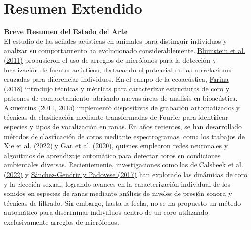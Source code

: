 \documentclass[a4paper,10pt,twocolumn]{article}
\begin{document}
\section{Resumen Extendido}\label{sec:intro}
  
\textbf{Breve Resumen del Estado del Arte}\\

El estudio de las señales acústicas en animales 
para distinguir individuos y analizar su 
comportamiento ha evolucionado considerablemente. 
\href{https://besjournals.onlinelibrary.wiley.com/doi/full/10.1111/j.1365-2664.2011.01993.x}{Blumstein et al. (2011)} propusieron el uso de arreglos 
de micrófonos para la detección y localización de 
fuentes acústicas, destacando el potencial de las 
correlaciones cruzadas para diferenciar individuos. 
En el campo de la ecoacústica, \href{https://www.mdpi.com/2227-7390/7/1/21}{Farina (2018)} introdujo 
técnicas y métricas para caracterizar estructuras de 
coro y patrones de comportamiento, abriendo nuevas 
áreas de análisis en bioacústica. 
Akmentins (\href{https://www.tandfonline.com/doi/abs/10.1080/00222933.2011.560967}{2011}, \href{https://www.tandfonline.com/doi/abs/10.1080/09524622.2014.965217}{2015}) implementó dispositivos de 
grabación automatizados y técnicas de clasificación 
mediante transformadas de Fourier para identificar 
especies y tipos de vocalización en ranas. 
En años recientes, se han desarrollado métodos de 
clasificación de coros mediante espectrogramas, 
como los trabajos de \href{https://www.sciencedirect.com/science/article/pii/S2666827021001018}{Xie et al. (2022)} y \href{https://www.sciencedirect.com/science/article/abs/pii/S1574954120301102}{Gan et al. (2020)}, 
quienes emplearon redes neuronales y algoritmos de 
aprendizaje automático para detectar coros en 
condiciones ambientales diversas. 
Recientemente, investigaciones como las de 
\href{https://onlinelibrary.wiley.com/doi/abs/10.1111/ele.14002}{Calsbeek et al. (2022)} y \href{https://www.sciencedirect.com/science/article/abs/pii/S1574954117300201}{Sánchez-Gendriz y Padovese (2017)} 
han explorado las dinámicas de coro y la elección sexual, 
logrando avances en la caracterización individual de 
los sonidos en especies de ranas mediante análisis de 
niveles de presión sonora y técnicas de filtrado. 
Sin embargo, hasta la fecha, no se ha propuesto un 
método automático para discriminar individuos dentro 
de un coro utilizando exclusivamente arreglos de 
micrófonos.\\
\end{document}

